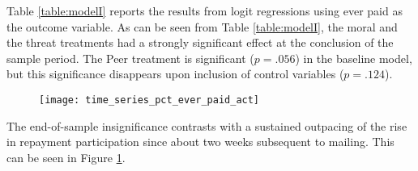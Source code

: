 \documentclass[12pt,titlepage]{article}
\begin{document}
Table \ref{table:modelI} reports the results from logit regressions using
ever paid as the outcome variable. As can be seen from Table \ref{table:modelI}, the moral and the threat
treatments had a strongly significant effect at the conclusion of the sample
period. The Peer treatment is significant ($p=.056$) in the baseline model, but
this significance disappears upon inclusion of control variables
($p=.124$).

\begin{figure}[htbp]
\caption{}\label{ever_paid_act}
\begin{center}
\texttt{[image: time\_series\_pct\_ever\_paid\_act]}
\par\end{center}
\end{figure}

The end-of-sample insignificance contrasts with a sustained outpacing
of the rise in repayment participation since about two weeks
subsequent to mailing.  This can be seen in Figure
\ref{ever_paid_act}.
\end{document}
